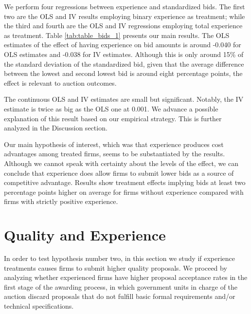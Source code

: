 We perform four regressions between experience and standardized bids. The first two are the OLS and IV results employing binary experience as treatment; while the third and fourth are the OLS and IV regressions employing total experience as treatment. Table \ref{tab:table_bids_1} presents our main results. The OLS estimates of the effect of having experience on bid amounts is around -0.040 for OLS estimates and -0.038 for IV estimates. Although this is only around 15\% of the standard deviation of the standardized bid, given that the average difference between the lowest and second lowest bid is around eight percentage points, the effect is relevant to auction outcomes.

The continuous OLS and IV estimates are small but significant. Notably, the IV estimate is twice as big as the OLS one at 0.001. We advance a possible explanation of this result based on our empirical strategy. This is further analyzed in the Discussion section.



Our main hypothesis of interest, which was that experience produces cost advantages among treated firms, seems to be substantiated by the results. Although we cannot speak with certainty about the levels of the effect, we can conclude that experience does allow firms to submit lower bids as a source of competitive advantage. Results show treatment effects implying bids at least two percentage points higher on average for firms without experience compared with firms with strictly positive experience.
\newpage

\section{Quality and Experience}
\label{section:qualityexp}
In order to test hypothesis number two, in this section we study if experience treatments causes firms to submit higher quality proposals. We proceed by analyzing whether experienced firms have higher proposal acceptance rates in the first stage of the awarding process, in which government units in charge of the auction discard proposals that do not fulfill basic formal requirements and/or technical specifications.


